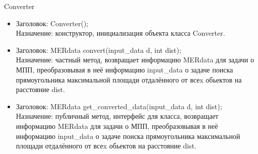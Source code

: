 \documentclass[a4paper,12pt]{article}
\begin{document}
{{\begin{center}
Converter
\end{center}
\begin{itemize}
\item Заголовок: Converter(); \\
Назначение: конструктор, инициализация объекта класса Converter.
\item Заголовок: MERdata convert(input\_data d, int dist);\\
Назначение: частный метод, возвращает информацию MERdata для задачи о МПП, преобразовывая в неё информацию input\_data о задаче поиска прямоугольника максимальной площади отдалённого от всеx обьектов на расстояние dist.
\item Заголовок: MERdata get\_converted\_data(input\_data d, int dist); \\
Назначение: публичный метод, интерфейс для класса, возвращает информацию MERdata для задачи о МПП, преобразовывая в неё информацию input\_data о задаче поиска прямоугольника максимальной площади отдалённого от всеx обьектов на расстояние dist.
\end{itemize}

}}
\end{document}
